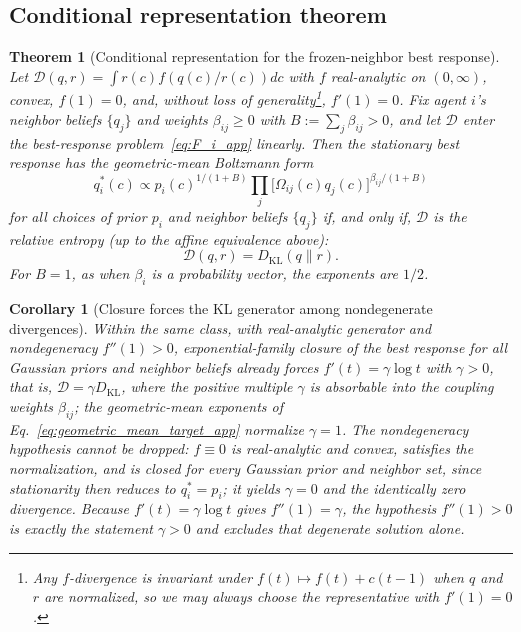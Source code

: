 \documentclass[11pt]{article}
\newtheorem{theorem}{Theorem}
\newtheorem{corollary}{Corollary}
\begin{document}
\subsection*{Conditional representation theorem}

\begin{theorem}[Conditional representation for the frozen-neighbor best response]\label{thm:representation_app}
Let\/ $\mathcal{D}(q,r) = \int r(c)f(q(c)/r(c))dc$ with $f$ \emph{real-analytic on $(0, \infty)$}, convex, $f(1)=0$, and, without loss of generality\footnote{Any $f$-divergence is invariant under $f(t)\mapsto f(t)+c(t-1)$ when $q$ and $r$ are normalized, so we may always choose the representative with $f'(1)=0$.}, $f'(1)=0$. Fix agent $i$'s neighbor beliefs $\{q_j\}$ and weights $\beta_{ij} \geq 0$ with $B := \sum_j \beta_{ij} > 0$, and let $\mathcal{D}$ enter the best-response problem~\eqref{eq:F_i_app} linearly. Then the stationary best response has the geometric-mean Boltzmann form
\begin{equation}
q_i^*(c) \propto p_i(c)^{1/(1+B)}\prod_{j}\bigl[\Omega_{ij}(c)q_j(c)\bigr]^{\beta_{ij}/(1+B)}
\label{eq:geometric_mean_target_app}
\end{equation}
for all choices of prior $p_i$ and neighbor beliefs $\{q_j\}$ if, and only if, $\mathcal{D}$ is the relative entropy (up to the affine equivalence above):
\[
\mathcal{D}(q,r) = D_{\mathrm{KL}}(q\|r).
\]
For $B = 1$, as when $\beta_i$ is a probability vector, the exponents are $1/2$.
\end{theorem}

\begin{corollary}[Closure forces the KL generator among nondegenerate divergences]
\label{cor:closure_forces_kl}
Within the same class, with real-analytic generator and nondegeneracy $f''(1) > 0$, exponential-family closure of the best response for all Gaussian priors and neighbor beliefs already forces $f'(t) = \gamma \log t$ with $\gamma > 0$, that is, $\mathcal{D} = \gamma D_{\mathrm{KL}}$, where the positive multiple $\gamma$ is absorbable into the coupling weights $\beta_{ij}$; the geometric-mean exponents of Eq.~\eqref{eq:geometric_mean_target_app} normalize $\gamma = 1$. The nondegeneracy hypothesis cannot be dropped: $f \equiv 0$ is real-analytic and convex, satisfies the normalization, and is closed for every Gaussian prior and neighbor set, since stationarity then reduces to $q_i^* = p_i$; it yields $\gamma = 0$ and the identically zero divergence. Because $f'(t) = \gamma \log t$ gives $f''(1) = \gamma$, the hypothesis $f''(1) > 0$ is exactly the statement $\gamma > 0$ and excludes that degenerate solution alone.
\end{corollary}
\end{document}
